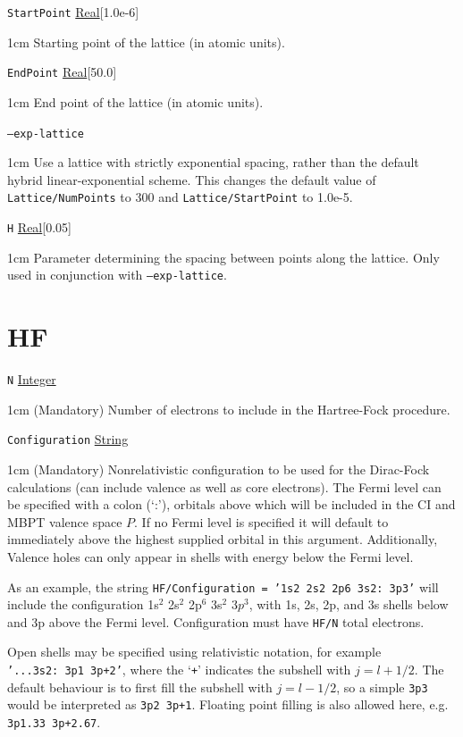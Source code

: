 \documentclass{report}
\begin{document}
\texttt{StartPoint} \uline{Real}[1.0e-6]
\begin{adjustwidth}{1cm}{}
Starting point of the lattice (in atomic units).
\end{adjustwidth}

\texttt{EndPoint} \uline{Real}[50.0]
\begin{adjustwidth}{1cm}{}
End point of the lattice (in atomic units).
\end{adjustwidth}

\texttt{--exp-lattice}
\begin{adjustwidth}{1cm}{}
Use a lattice with strictly exponential spacing, rather than the default hybrid linear-exponential
scheme. This changes the default value of \texttt{Lattice/NumPoints} to 300 and
\texttt{Lattice/StartPoint} to 1.0e-5.
\end{adjustwidth}

\texttt{H} \uline{Real}[0.05]
\begin{adjustwidth}{1cm}{}
Parameter determining the spacing between points along the lattice. Only used in conjunction with
\texttt{--exp-lattice}.
\end{adjustwidth}

\section{HF}

\texttt{N} \uline{Integer}
\begin{adjustwidth}{1cm}{}
(Mandatory) Number of electrons to include in the Hartree-Fock procedure.
\end{adjustwidth}
\texttt{Configuration} \uline{String} 
\begin{adjustwidth}{1cm}{}
(Mandatory) Nonrelativistic configuration to be used for the
Dirac-Fock calculations (can include valence as well as core electrons). The Fermi level can be specified
with a colon (`:'), orbitals above which will be included in the CI and MBPT valence space $P$. If no
Fermi level is specified it will default to immediately above the highest supplied orbital in this
argument. Additionally, Valence holes can only appear in shells with energy below the Fermi level.
                                                                               
As an example, the string \texttt{HF/Configuration = '1s2 2s2 2p6 3s2:~3p3'} will include the configuration
1s$^2$ 2s$^2$ 2p$^6$ 3s$^2$ $3p^3$, with 1s, 2s, 2p, and 3s shells below and 3p above the Fermi level.
Configuration must have \texttt{HF/N} total electrons.

Open shells may be specified using relativistic notation, for example \texttt{'...3s2:~3p1 3p+2'}, where the `\texttt{+}' indicates the subshell with $j = l+1/2$. The default behaviour is to first fill the subshell with $j = l-1/2$, so a simple \texttt{3p3} would be interpreted as \texttt{3p2 3p+1}. Floating point filling is also allowed here, e.g. \texttt{3p1.33 3p+2.67}.
\end{adjustwidth}
\end{document}
